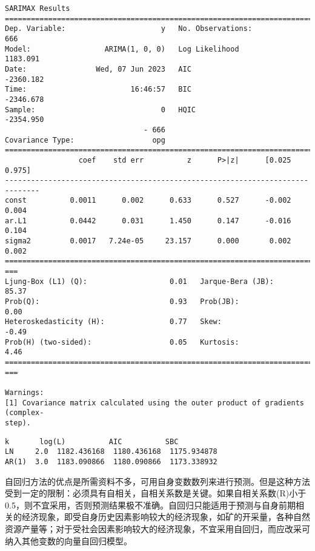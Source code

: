 \documentclass[11pt]{article}
\makeatletter
\newcommand{\boxspacing}{\kern\kvtcb@left@rule\kern\kvtcb@boxsep}
\newcommand{\prompt}[4]{
        {\ttfamily\llap{{\color{#2}[#3]:\hspace{3pt}#4}}\vspace{-\baselineskip}}
    }
\makeatother
\begin{document}
    \begin{Verbatim}[commandchars=\\\{\}]
                               SARIMAX Results
==============================================================================
Dep. Variable:                      y   No. Observations:                  666
Model:                 ARIMA(1, 0, 0)   Log Likelihood                1183.091
Date:                Wed, 07 Jun 2023   AIC                          -2360.182
Time:                        16:46:57   BIC                          -2346.678
Sample:                             0   HQIC                         -2354.950
                                - 666
Covariance Type:                  opg
==============================================================================
                 coef    std err          z      P>|z|      [0.025      0.975]
------------------------------------------------------------------------------
const          0.0011      0.002      0.633      0.527      -0.002       0.004
ar.L1          0.0442      0.031      1.450      0.147      -0.016       0.104
sigma2         0.0017   7.24e-05     23.157      0.000       0.002       0.002
================================================================================
===
Ljung-Box (L1) (Q):                   0.01   Jarque-Bera (JB):
85.37
Prob(Q):                              0.93   Prob(JB):
0.00
Heteroskedasticity (H):               0.77   Skew:
-0.49
Prob(H) (two-sided):                  0.05   Kurtosis:
4.46
================================================================================
===

Warnings:
[1] Covariance matrix calculated using the outer product of gradients (complex-
step).
    \end{Verbatim}

            \begin{tcolorbox}[breakable, size=fbox, boxrule=.5pt, pad at break*=1mm, opacityfill=0]
\prompt{Out}{outcolor}{50}{\boxspacing}
\begin{Verbatim}[commandchars=\\\{\}]
         k       log(L)          AIC          SBC
LN     2.0  1182.436168  1180.436168  1175.934878
AR(1)  3.0  1183.090866  1180.090866  1173.338932
\end{Verbatim}
\end{tcolorbox}

    自回归方法的优点是所需资料不多，可用自身变数数列来进行预测。但是这种方法受到一定的限制：必须具有自相关，自相关系数是关键。如果自相关系数(R)小于0.5，则不宜采用，否则预测结果极不准确。自回归只能适用于预测与自身前期相关的经济现象，即受自身历史因素影响较大的经济现象，如矿的开采量，各种自然资源产量等；对于受社会因素影响较大的经济现象，不宜采用自回归，而应改采可纳入其他变数的向量自回归模型。
\end{document}

